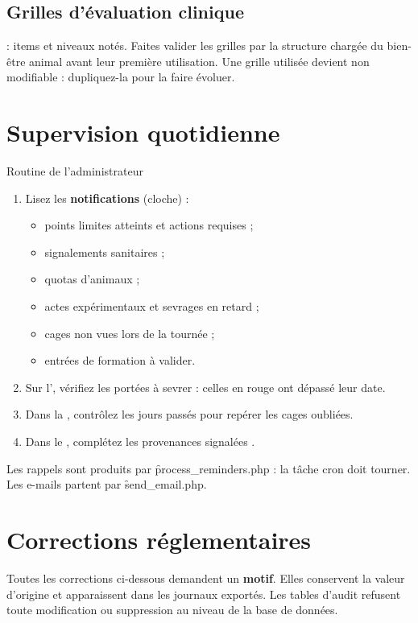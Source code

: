\documentclass[11pt,a4paper]{article}
\begin{document}
\subsection{Grilles d'évaluation clinique}
 : items et niveaux notés.
Faites valider les grilles par la structure chargée du bien-être animal avant
leur première utilisation. Une grille utilisée devient non modifiable :
dupliquez-la pour la faire évoluer.

\section{Supervision quotidienne}\label{sec:supervision}
\begin{procedure}{Routine de l'administrateur}
\begin{enumerate}
  \item Lisez les \textbf{notifications} (cloche) :
    \begin{itemize}
      \item points limites atteints et actions requises ;
      \item signalements sanitaires ;
      \item quotas d'animaux ;
      \item actes expérimentaux et sevrages en retard ;
      \item cages non vues lors de la tournée ;
      \item entrées de formation à valider.
    \end{itemize}
  \item Sur l', vérifiez les portées à sevrer : celles en
    rouge ont dépassé leur date.
  \item Dans la , contrôlez les jours passés pour
    repérer les cages oubliées.
  \item Dans le , complétez les
    provenances signalées .
\end{enumerate}
\end{procedure}
Les rappels sont produits par \f{process_reminders.php} : la tâche cron doit
tourner. Les e-mails partent par \f{send_email.php}.

\section{Corrections réglementaires}\label{sec:corrections}
\begin{trace}
Toutes les corrections ci-dessous demandent un \textbf{motif}. Elles
conservent la valeur d'origine et apparaissent dans les journaux exportés.
Les tables d'audit refusent toute modification ou suppression au niveau de la
base de données.
\end{trace}
\end{document}

